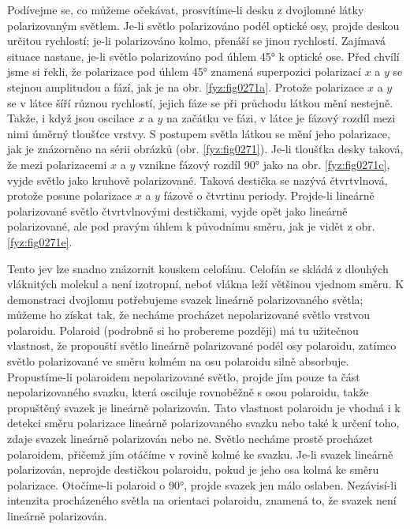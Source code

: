     Podívejme se, co můžeme očekávat, prosvítíme-li desku z dvojlomné látky polarizovaným světlem.
    Je-li světlo polarizováno podél optické osy, projde deskou určitou rychlostí; je-li polarizováno
    kolmo, přenáší se jinou rychlostí. Zajímavá situace nastane, je-li světlo polarizováno pod úhlem
    \ang{45} k optické ose. Před chvílí jsme si řekli, že polarizace pod úhlem \ang{45} znamená
    superpozici polarizací \(x\) a \(y\) se stejnou amplitudou a fází, jak je na obr.
    \ref{fyz:fig0271a}. Protože polarizace \(x\) a \(y\) se v látce šíří různou rychlostí, jejich
    fáze se při průchodu látkou mění nestejně. Takže, i když jsou oscilace \(x\) a \(y\) na začátku
    ve fázi, v látce je fázový rozdíl mezi nimi úměrný tloušťce vrstvy. S postupem světla látkou se
    mění jeho polarizace, jak je znázorněno na sérii obrázků (obr. \ref{fyz:fig0271}). Je-li tloušťka
    desky taková, že mezi polarizacemi \(x\) a \(y\) vznikne fázový rozdíl \ang{90} jako na obr.
    \ref{fyz:fig0271c}, vyjde světlo jako kruhově polarizované. Taková destička se nazývá
    čtvrtvlnová, protože posune polarizace \(x\) a \(y\) fázově o čtvrtinu periody. Projde-li
    lineárně polarizované světlo čtvrtvlnovými destičkami, vyjde opět jako lineárně polarizované,
    ale pod pravým úhlem k původnímu směru, jak je vidět z obr. \ref{fyz:fig0271e}.

    Tento jev lze snadno znázornit kouskem celofánu. Celofán se skládá z dlouhých vláknitých molekul
    a není izotropní, neboť vlákna leží většinou vjednom směru. K demonstraci dvojlomu potřebujeme
    svazek lineárně polarizovaného světla; můžeme ho získat tak, že necháme procházet nepolarizované
    světlo vrstvou polaroidu. Polaroid (podrobně si ho probereme později) má tu užitečnou vlastnost,
    že propouští světlo lineárně polarizované podél osy polaroidu, zatímco světlo polarizované ve
    směru kolmém na osu polaroidu silně absorbuje. Propustíme-li polaroidem nepolarizované světlo,
    projde jím pouze ta část nepolarizovaného svazku, která osciluje rovnoběžně s osou polaroidu,
    takže propuštěný svazek je lineárně polarizován. Tato vlastnost polaroidu je vhodná i k detekci
    směru polarizace lineárně polarizovaného svazku nebo také k určení toho, zdaje svazek lineárně
    polarizován nebo ne. Světlo necháme prostě procházet polaroidem, přičemž jím otáčíme v rovině
    kolmé ke svazku. Je-li svazek lineárně polarizován, neprojde destičkou polaroidu, pokud je jeho
    osa kolmá ke směru polarizace. Otočíme-li polaroid o \ang{90}, projde svazek jen málo oslaben.
    Nezávisí-li intenzita procházeného světla na orientaci polaroidu, znamená to, že svazek není
    lineárně polarizován.

